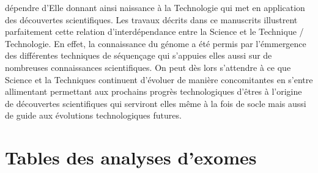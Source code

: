 \documentclass[12pt,twoside]{reedthesis}
\theoremstyle{definition}
\theoremstyle{definition}
\theoremstyle{remark}
\begin{document}
  dépendre d'Elle donnant ainsi naissance à la Technologie qui met en
  application des découvertes scientifiques. Les travaux décrits dans ce
  manuscrits illustrent parfaitement cette relation d'interdépendance
  entre la Science et le Technique / Technologie. En effet, la
  connaissance du génome a été permis par l'émmergence des différentes
  techniques de séquençage qui s'appuies elles aussi sur de nombreuses
  connaissances scientifiques. On peut dès lors s'attendre à ce que
  Science et la Techniques continuent d'évoluer de manière concomitantes
  en s'entre allimentant permettant aux prochains progrès technologiques
  d'êtres à l'origine de découvertes scientifiques qui serviront elles
  même à la fois de socle mais aussi de guide aux évolutions
  technologiques futures.
  
  \newpage
  
  \appendix
  
  \chapter{Tables des analyses d'exomes}\label{sssdd}
  
  \newpage
  
\end{document}
